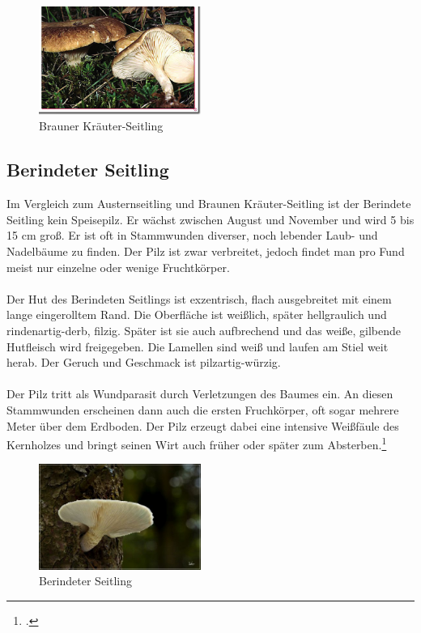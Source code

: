 \documentclass[a4paper,abstracton]{scrreprt}
\begin{document}
\begin{figure}[H]
\centering
\includegraphics[width=200px]{kraeuterseitling}
\caption[Brauner Kräuter-Seitling]{Brauner Kräuter-Seitling\protect\footnotemark}
\label{fig:kraeuterseitling}
\end{figure}

\subsection{Berindeter Seitling}
Im Vergleich zum Austernseitling und Braunen Kräuter-Seitling ist der Berindete Seitling kein Speisepilz. Er wächst zwischen August und November und wird 5 bis 15 cm groß. Er ist oft in Stammwunden diverser, noch lebender Laub- und Nadelbäume zu finden. Der Pilz ist zwar verbreitet, jedoch findet man pro Fund meist nur einzelne oder wenige Fruchtkörper.\\
\\Der Hut des Berindeten Seitlings ist exzentrisch, flach ausgebreitet mit einem lange eingerolltem Rand. Die Oberfläche ist weißlich, später hellgraulich und rindenartig-derb, filzig. Später ist sie auch aufbrechend und das weiße, gilbende Hutfleisch wird freigegeben. Die Lamellen sind weiß und laufen am Stiel weit herab. Der Geruch und Geschmack ist pilzartig-würzig.\\
\\Der Pilz tritt als Wundparasit durch Verletzungen des Baumes ein. An diesen Stammwunden erscheinen dann auch die ersten Fruchkörper, oft sogar mehrere Meter über dem Erdboden. Der Pilz erzeugt dabei eine intensive Weißfäule des Kernholzes und bringt seinen Wirt auch früher oder später zum Absterben.\footcite{tintling:lungenseitling}

\begin{figure}[H]
\centering
\includegraphics[width=200px]{berindeter_seitling}
\caption[Berindeter Seitling]{Berindeter Seitling\protect\footnotemark}
\label{fig:berindeter_seitling}
\end{figure}
\end{document}

